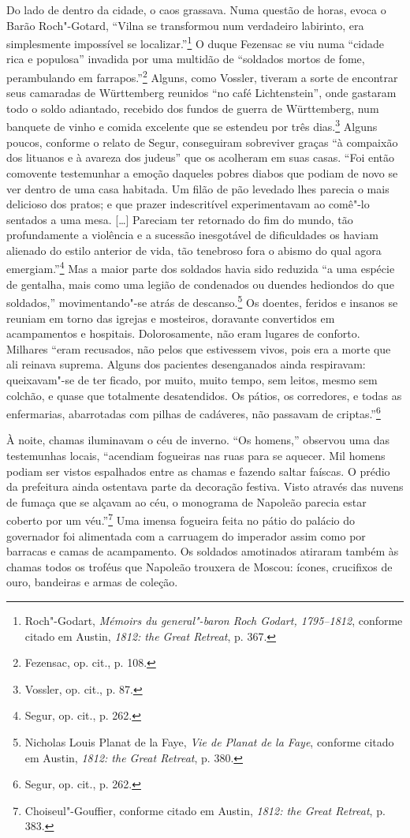 Do lado de dentro da cidade, o caos grassava. Numa questão de horas,
evoca o Barão Roch"-Gotard, ``Vilna se transformou num verdadeiro
labirinto, era simplesmente impossível se localizar.''\footnote{Roch"-Godart, \textit{Mémoirs du general"-baron Roch Godart, 1795--1812}, conforme citado em Austin, \textit{1812: the Great Retreat}, p. 367.} O duque Fezensac se viu numa ``cidade rica e populosa'' invadida por uma
multidão de ``soldados mortos de fome, perambulando em
farrapos.''\footnote{Fezensac, op. cit., p. 108.} Alguns, como Vossler,
tiveram a sorte de encontrar seus camaradas de Württemberg reunidos ``no
café Lichtenstein'', onde gastaram todo o soldo adiantado, recebido dos
fundos de guerra de Württemberg, num banquete de vinho e comida
excelente que se estendeu por três dias.\footnote{Vossler, op. cit., p. 87.} Alguns poucos, conforme o relato de Segur, conseguiram sobreviver graças ``à compaixão dos lituanos e à avareza dos judeus'' que os
acolheram em suas casas. ``Foi então comovente testemunhar a emoção
daqueles pobres diabos que podiam de novo se ver dentro de uma casa
habitada. Um filão de pão levedado lhes parecia o mais delicioso dos
pratos; e que prazer indescritível experimentavam ao comê"-lo sentados a
uma mesa. [\ldots{}] Pareciam ter retornado do fim do mundo, tão
profundamente a violência e a sucessão inesgotável de dificuldades os
haviam alienado do estilo anterior de vida, tão tenebroso fora o abismo
do qual agora emergiam.''\footnote{Segur, op. cit., p. 262.} Mas a maior
parte dos soldados havia sido reduzida ``a uma espécie de gentalha, mais
como uma legião de condenados ou duendes hediondos do que soldados,''
movimentando"-se atrás de descanso.\footnote{Nicholas Louis Planat de la Faye, \textit{Vie de Planat de la Faye}, conforme citado em Austin, \textit{1812: the Great Retreat}, p. 380.} Os doentes, feridos e insanos se reuniam em torno das igrejas e mosteiros, doravante convertidos em
acampamentos e hospitais. Dolorosamente, não eram lugares de conforto.
Milhares ``eram recusados, não pelos que estivessem vivos, pois era a
morte que ali reinava suprema. Alguns dos pacientes desenganados ainda
respiravam: queixavam"-se de ter ficado, por muito, muito tempo, sem
leitos, mesmo sem colchão, e quase que totalmente desatendidos. Os
pátios, os corredores, e todas as enfermarias, abarrotadas com pilhas de
cadáveres, não passavam de criptas.''\footnote{Segur, op. cit., p. 262.}

À noite, chamas iluminavam o céu de inverno. ``Os homens,'' observou uma
das testemunhas locais, ``acendiam fogueiras nas ruas para se aquecer.
Mil homens podiam ser vistos espalhados entre as chamas e fazendo saltar
faíscas. O prédio da prefeitura ainda ostentava parte da decoração
festiva. Visto através das nuvens de fumaça que se alçavam ao céu, o
monograma de Napoleão parecia estar coberto por um véu.''\footnote{Choiseul"-Gouffier, conforme citado em Austin, \textit{1812: the Great Retreat}, p. 383.} Uma imensa fogueira feita no pátio do palácio do governador foi
alimentada com a carruagem do imperador assim como por barracas e camas
de acampamento. Os soldados amotinados atiraram também às chamas todos
os troféus que Napoleão trouxera de Moscou: ícones, crucifixos de ouro,
bandeiras e armas de coleção.


